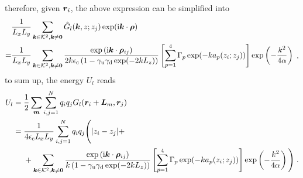 therefore, given $\bm{r}_i$, the above expression can be simplified into
\begin{align*}
 &\frac{1}{ L_xL_y}   \sum_{\bm{k}\in\mathcal{K}^2,\bm{k}\neq\bm{0}} \Hat{G}_l(\bm{k},z;z_j)\exp(\textrm{i}\bm{k}\cdot \bm{\rho})\\
 =& \frac{1}{ L_xL_y}   \sum_{\bm{k}\in\mathcal{K}^2,\bm{k}\neq\bm{0}} \frac{ \exp{(\mathrm{i} \boldsymbol{k} \cdot \boldsymbol{\rho}_{ij})}}{2k\epsilon_{\mathrm{c}}\left(1-\gamma_{\mathrm{u}}\gamma_{\mathrm{d}}\exp(-2kL_z)\right)}\left[\sum_{p=1}^4\Gamma_p\exp(-ka_p(z_i;z_j))\right] \exp\left(-\frac{k^2}{4\alpha}\right)\;,
\end{align*}
to sum up, the energy $U_l$ reads
\begin{align*}
U_l&=\frac{1}{2}\sum_{\bm{m}}\sum_{i,j=1}^N q_iq_j     G_l(\boldsymbol{r}_i+\bm{L}_m, \boldsymbol{r}_j)\\
&=\frac{1}{4\epsilon_{\mathrm{c}} L_xL_y}\sum_{i,j=1}^N  q_iq_j \Bigg({\left\lvert z_i-z_j\right\rvert} +\\&~~~~+  \sum_{\bm{k}\in\mathcal{K}^2,\bm{k}\neq\bm{0}} \frac{ \exp{(\mathrm{i} \boldsymbol{k} \cdot \boldsymbol{\rho}_{ij})}}{k\left(1-\gamma_{\mathrm{u}}\gamma_{\mathrm{d}}\exp(-2kL_z)\right)}\left[\sum_{p=1}^4\Gamma_p\exp(-ka_p(z_i;z_j))\right] \exp\left(-\frac{k^2}{4\alpha}\right)\Bigg)\;.
\end{align*}


